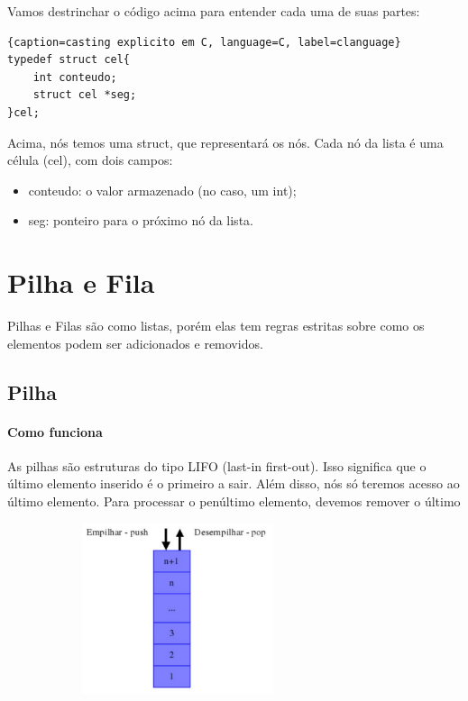 \documentclass{report}
\begin{document}
	Vamos destrinchar o código acima para entender cada uma de suas partes:
	
	\begin{center}
		
		\begin{lstlisting}{caption=casting explicito em C, language=C, label=clanguage}
typedef struct cel{
	int conteudo;
	struct cel *seg;
}cel;

		\end{lstlisting}
	\end{center}
	
	Acima, nós temos uma struct, que representará os nós. Cada nó da lista é uma célula (cel), com dois campos:
	
	\begin{itemize}
		\item conteudo: o valor armazenado (no caso, um int);
		\item seg: ponteiro para o próximo nó da lista.
	\end{itemize}
	
	
	
	\chapter{Pilha e Fila}
	
	Pilhas e Filas são como listas, porém elas tem regras estritas sobre como os elementos podem ser adicionados e removidos.
	
	\section{Pilha}
	
	\subsubsection{Como funciona}
	
	As pilhas são estruturas do tipo LIFO (last-in first-out). Isso significa que o último elemento inserido é o primeiro a sair. Além disso, nós só teremos acesso ao último elemento. Para processar o penúltimo elemento, devemos remover o último
	
		
	
	\begin{center}
		
		\includegraphics[width=10cm,height=5cm,keepaspectratio=false]{imagens/pilha.png}
		
	\end{center}
	
\end{document}
